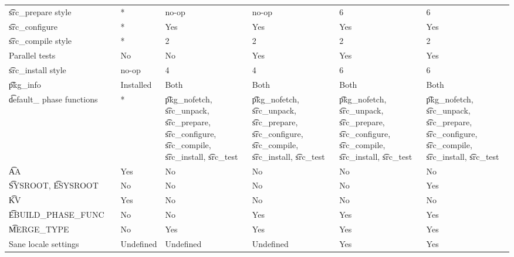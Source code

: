 \begin{landscape}
\begin{longtable}{llP{7.5em}P{7.5em}P{7.5em}P{7.5em}P{7.5em}}
\t{src_prepare} style &  &
    * & no-op & no-op & 6 & 6 \\

\t{src_configure} &  &
    * & Yes & Yes & Yes & Yes \\

\t{src_compile} style &  &
    * & 2 & 2 & 2 & 2 \\

Parallel tests &  &
    No & No & Yes & Yes & Yes \\

\t{src_install} style &  &
    no-op & 4 & 4 & 6 & 6 \\

\t{pkg_info} &  &
    Installed & Both & Both & Both & Both \\

\t{default_} phase functions &  &
    * &
    \t{pkg_nofetch}, \t{src_unpack}, \t{src_prepare}, \t{src_configure},
        \t{src_compile}, \t{src_install}, \t{src_test} &
    \t{pkg_nofetch}, \t{src_unpack}, \t{src_prepare}, \t{src_configure},
        \t{src_compile}, \t{src_install}, \t{src_test} &
    \t{pkg_nofetch}, \t{src_unpack}, \t{src_prepare}, \t{src_configure},
        \t{src_compile}, \t{src_install}, \t{src_test} &
    \t{pkg_nofetch}, \t{src_unpack}, \t{src_prepare}, \t{src_configure},
        \t{src_compile}, \t{src_install}, \t{src_test} \\

\t{AA} &  &
    Yes & No & No & No & No \\

\t{SYSROOT}, \t{ESYSROOT} &  &
    No & No & No & No & Yes \\

\t{KV} &  &
    Yes & No & No & No & No \\

\t{EBUILD_PHASE_FUNC} &  &
    No & No & Yes & Yes & Yes \\

\t{MERGE_TYPE} &  &
    No & Yes & Yes & Yes & Yes \\

Sane locale settings &  &
    Undefined & Undefined & Undefined & Yes & Yes \\


\end{longtable}
\end{landscape}
